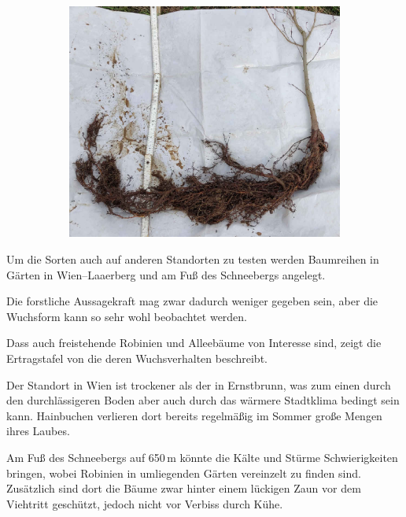 \documentclass[twocolumn]{scrartcl}
\begin{document}
\begin{figure}[htbp]
\begin{subfigure}[t]{0.95\linewidth}
  \end{subfigure}
  \begin{subfigure}[t]{0.95\linewidth}
    \centering
    \includegraphics[width=\linewidth]{./bild/wurzelUlme}
  \end{subfigure}
  \label{fig:wurzelAndere}
\end{figure}

Um die Sorten auch auf anderen Standorten zu testen werden Baumreihen
in Gärten in Wien--Laaerberg und am Fuß des Schneebergs angelegt.

Die forstliche Aussagekraft mag zwar dadurch weniger gegeben sein,
aber die Wuchsform kann so sehr wohl beobachtet werden.

Dass auch freistehende Robinien und Alleebäume von Interesse sind,
zeigt die Ertragstafel von \citet{fekete1931robinieErtragstafel} die
deren Wuchsverhalten beschreibt.

Der Standort in Wien ist trockener als der in Ernstbrunn, was zum
einen durch den durchlässigeren Boden aber auch durch das wärmere
Stadtklima bedingt sein kann. Hainbuchen verlieren dort bereits
regelmäßig im Sommer große Mengen ihres Laubes.

Am Fuß des Schneebergs auf 650\,m könnte die Kälte und Stürme
Schwierigkeiten bringen, wobei Robinien in umliegenden Gärten
vereinzelt zu finden sind. Zusätzlich sind dort die Bäume zwar hinter
einem lückigen Zaun vor dem Viehtritt geschützt, jedoch nicht vor
Verbiss durch Kühe.
\end{document}
